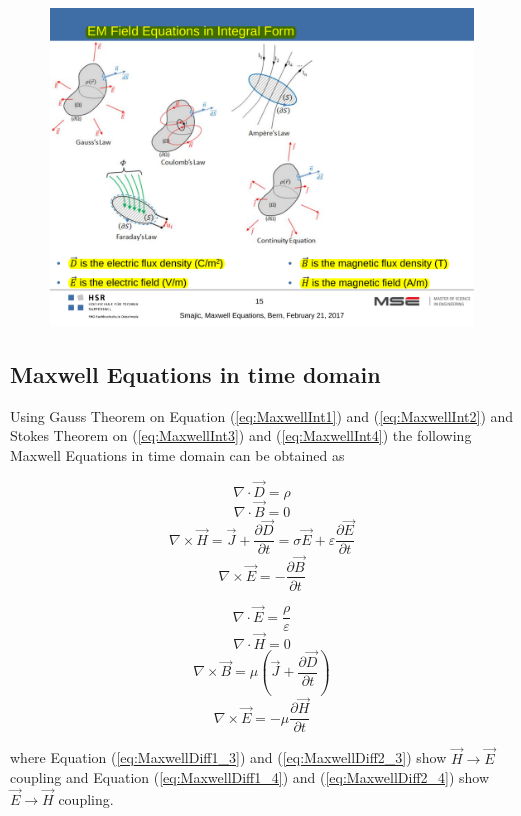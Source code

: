 \begin{figure}[h!]
	\centering
	\includegraphics[width=.55\textwidth]{./images/MaxwellEqImages.pdf}
\end{figure}

\subsection{Maxwell Equations in time domain}
Using Gauss Theorem on Equation (\ref{eq:MaxwellInt1}) and (\ref{eq:MaxwellInt2}) and Stokes Theorem on (\ref{eq:MaxwellInt3}) and (\ref{eq:MaxwellInt4}) the following Maxwell Equations in time domain can be obtained as 
\begin{multicols}{2}
	\begin{equation}
		\nabla \cdot \vec{D} = \rho
		\label{eq:MaxwellDiff1_1}
	\end{equation}
	\begin{equation}
		\nabla \cdot \vec{B} = 0
		\label{eq:MaxwellDiff1_2}
	\end{equation}
	\begin{equation}
		\nabla \times \vec{H} = \vec{J} + \frac{\partial \vec{D}}{\partial t} = \sigma \vec{E} + \varepsilon \frac{\partial \vec{E}}{\partial t}
		\label{eq:MaxwellDiff1_3}
	\end{equation}
	\begin{equation}
		\nabla \times \vec{E} = - \frac{\partial \vec{B}}{\partial t}
		\label{eq:MaxwellDiff1_4}
	\end{equation}
	
	\begin{equation}
		\nabla \cdot \vec{E} = \frac{\rho}{\varepsilon}
		\label{eq:MaxwellDiff2_1}
	\end{equation}
	\begin{equation}
		\nabla \cdot \vec{H} = 0
		\label{eq:MaxwellDiff2_2}
	\end{equation}
	\begin{equation}
		\nabla \times \vec{B} = \mu\left(\vec{J} + \frac{\partial \vec{D}}{\partial t}\right)
		\label{eq:MaxwellDiff2_3}
	\end{equation}
	\begin{equation}
		\nabla \times \vec{E} = -\mu \frac{\partial \vec{H}}{\partial t}
		\label{eq:MaxwellDiff2_4}
	\end{equation}
\end{multicols}
where Equation (\ref{eq:MaxwellDiff1_3}) and (\ref{eq:MaxwellDiff2_3}) show $\vec{H} \rightarrow \vec{E}$ coupling and Equation (\ref{eq:MaxwellDiff1_4}) and (\ref{eq:MaxwellDiff2_4}) show $\vec{E} \rightarrow \vec{H}$ coupling.

